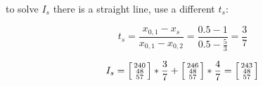 \documentclass[a4paper,10pt]{article}
\begin{document}
to solve $I_{s}$ there is a straight line, use a different $t_{s}$: 

$$ t_{s} = \frac{x_{0,1}-x_{s}}{x_{0,1}-x_{0,2}} = \frac{0.5-1}{0.5-\frac{5}{3}} = \frac{3}{7} $$

$$
I_{s} = \left[\begin{smallmatrix}
   240  \\
   48 \\
   57
   \end{smallmatrix}\right] * \frac{3}{7} + \left[\begin{smallmatrix}
   246  \\
   48 \\
   57
   \end{smallmatrix}\right] * \frac{4}{7} = \bf{ \left[\begin{smallmatrix}
   243  \\
   48 \\
   57
\end{smallmatrix}\right] } $$
\end{document}
